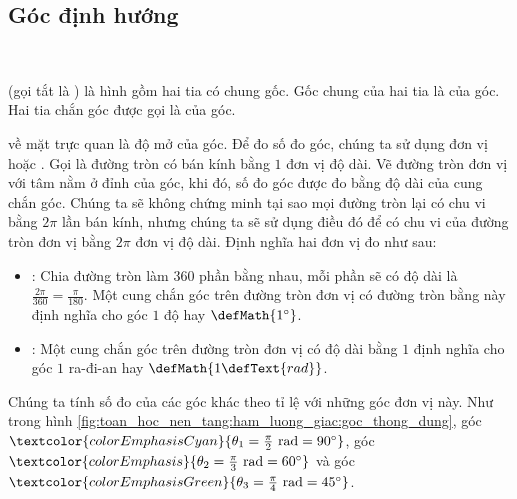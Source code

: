 \subsection{Góc định hướng}

\ %

 (gọi tắt là ) là hình gồm hai tia có chung gốc. Gốc chung của hai tia là  của góc. Hai tia chắn góc được gọi là  của góc.

 về mặt trực quan là độ mở của góc. Để đo số đo góc, chúng ta sử dụng đơn vị  hoặc . Gọi  là đường tròn có bán kính bằng $1$ đơn vị độ dài. Vẽ đường tròn đơn vị với tâm nằm ở đỉnh của góc, khi đó, số đo góc được đo bằng độ dài của cung chắn góc. Chúng ta sẽ không chứng minh tại sao mọi đường tròn lại có chu vi bằng $2\pi$ lần bán kính, nhưng chúng ta sẽ sử dụng điều đó để có chu vi của đường tròn đơn vị bằng $2\pi$ đơn vị độ dài. Định nghĩa hai đơn vị đo như sau:
\begin{itemize}
   \item {}: Chia đường tròn làm $360$ phần bằng nhau, mỗi phần sẽ có độ dài là $\frac{2\pi}{360} = \frac{\pi}{180}$. Một cung chắn góc trên đường tròn đơn vị có đường tròn bằng này định nghĩa cho góc $1$ độ hay $\defMath{1^\circ}$.
   \item {}: Một cung chắn góc trên đường tròn đơn vị có độ dài bằng $1$ định nghĩa cho góc $1$ ra-đi-an hay $\defMath{1\defText{ rad}}$.
\end{itemize}

Chúng ta tính số đo của các góc khác theo tỉ lệ với những góc đơn vị này. Như trong hình \ref{fig:toan_hoc_nen_tang:ham_luong_giac:goc_thong_dung}, góc $\textcolor{colorEmphasisCyan}{\theta_1 = \frac{\pi}{2} \text{ rad} = 90^\circ}$, góc $\textcolor{colorEmphasis}{\theta_2 = \frac{\pi}{3} \text{ rad} = 60^\circ}$ và góc $\textcolor{colorEmphasisGreen}{\theta_3 = \frac{\pi}{4} \text{ rad} = 45^\circ}$.

